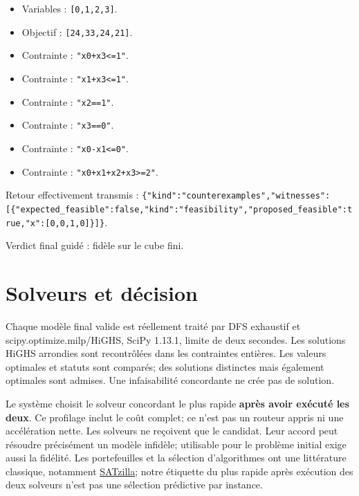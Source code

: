 \documentclass[11pt]{article}
\begin{document}
\begin{itemize}
\item Variables : \texttt{[\allowbreak{}0,\allowbreak{}1,\allowbreak{}2,\allowbreak{}3]\allowbreak{}}.
\item Objectif : \texttt{[\allowbreak{}24,\allowbreak{}33,\allowbreak{}24,\allowbreak{}21]\allowbreak{}}.
\item Contrainte : \texttt{"x0+\allowbreak{}x3<=\allowbreak{}1"}.
\item Contrainte : \texttt{"x1+\allowbreak{}x3<=\allowbreak{}1"}.
\item Contrainte : \texttt{"x2=\allowbreak{}=\allowbreak{}1"}.
\item Contrainte : \texttt{"x3=\allowbreak{}=\allowbreak{}0"}.
\item Contrainte : \texttt{"x0-\allowbreak{}x1<=\allowbreak{}0"}.
\item Contrainte : \texttt{"x0+\allowbreak{}x1+\allowbreak{}x2+\allowbreak{}x3>=\allowbreak{}2"}.
\end{itemize}

Retour effectivement transmis : \texttt{\{"kind":\allowbreak{}"counterex\allowbreak{}amples",\allowbreak{}"witnesses\allowbreak{}":\allowbreak{}[\allowbreak{}\{"expected\allowbreak{}\_\allowbreak{}feasible":\allowbreak{}false,\allowbreak{}"kind":\allowbreak{}"feasibili\allowbreak{}ty",\allowbreak{}"proposed\_\allowbreak{}feasible":\allowbreak{}true,\allowbreak{}"x":\allowbreak{}[\allowbreak{}0,\allowbreak{}0,\allowbreak{}1,\allowbreak{}0]\allowbreak{}\}]\allowbreak{}\}}.

Verdict final guidé : fidèle sur le cube fini.

\section{Solveurs et décision}

Chaque modèle final valide est réellement traité par DFS exhaustif et scipy.optimize.milp/HiGHS, SciPy 1.13.1, limite de deux secondes. Les solutions HiGHS arrondies sont recontrôlées dans les contraintes entières. Les valeurs optimales et statuts sont comparés; des solutions distinctes mais également optimales sont admises. Une infaisabilité concordante ne crée pas de solution.

Le système choisit le solveur concordant le plus rapide \textbf{après avoir exécuté les deux}. Ce profilage inclut le coût complet; ce n'est pas un routeur appris ni une accélération nette. Les solveurs ne reçoivent que le candidat. Leur accord peut résoudre précisément un modèle infidèle; utilisable pour le problème initial exige aussi la fidélité. Les portefeuilles et la sélection d'algorithmes ont une littérature classique, notamment \href{\detokenize{https://doi.org/10.1613/jair.2490}}{SATzilla}; notre étiquette du plus rapide après exécution des deux solveurs n'est pas une sélection prédictive par instance.
\end{document}
